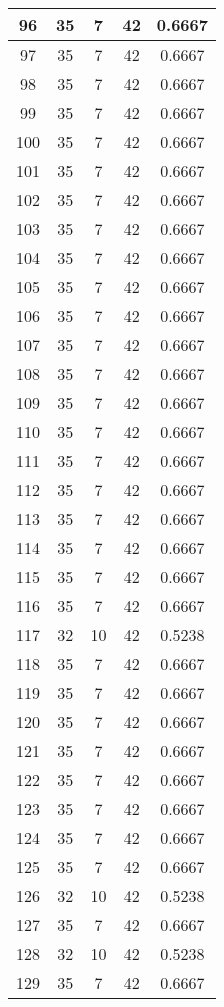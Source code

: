 \documentclass[letterpaper, 12pt]{article}
\begin{document}
\begin{longtable}{|c|c|c|c|c|}
\hline
96 & 35 & 7 & 42 & 0.6667 \\
\hline
97 & 35 & 7 & 42 & 0.6667 \\
\hline
98 & 35 & 7 & 42 & 0.6667 \\
\hline
99 & 35 & 7 & 42 & 0.6667 \\
\hline
100 & 35 & 7 & 42 & 0.6667 \\
\hline
101 & 35 & 7 & 42 & 0.6667 \\
\hline
102 & 35 & 7 & 42 & 0.6667 \\
\hline
103 & 35 & 7 & 42 & 0.6667 \\
\hline
104 & 35 & 7 & 42 & 0.6667 \\
\hline
105 & 35 & 7 & 42 & 0.6667 \\
\hline
106 & 35 & 7 & 42 & 0.6667 \\
\hline
107 & 35 & 7 & 42 & 0.6667 \\
\hline
108 & 35 & 7 & 42 & 0.6667 \\
\hline
109 & 35 & 7 & 42 & 0.6667 \\
\hline
110 & 35 & 7 & 42 & 0.6667 \\
\hline
111 & 35 & 7 & 42 & 0.6667 \\
\hline
112 & 35 & 7 & 42 & 0.6667 \\
\hline
113 & 35 & 7 & 42 & 0.6667 \\
\hline
114 & 35 & 7 & 42 & 0.6667 \\
\hline
115 & 35 & 7 & 42 & 0.6667 \\
\hline
116 & 35 & 7 & 42 & 0.6667 \\
\hline
117 & 32 & 10 & 42 & 0.5238 \\
\hline
118 & 35 & 7 & 42 & 0.6667 \\
\hline
119 & 35 & 7 & 42 & 0.6667 \\
\hline
120 & 35 & 7 & 42 & 0.6667 \\
\hline
121 & 35 & 7 & 42 & 0.6667 \\
\hline
122 & 35 & 7 & 42 & 0.6667 \\
\hline
123 & 35 & 7 & 42 & 0.6667 \\
\hline
124 & 35 & 7 & 42 & 0.6667 \\
\hline
125 & 35 & 7 & 42 & 0.6667 \\
\hline
126 & 32 & 10 & 42 & 0.5238 \\
\hline
127 & 35 & 7 & 42 & 0.6667 \\
\hline
128 & 32 & 10 & 42 & 0.5238 \\
\hline
129 & 35 & 7 & 42 & 0.6667 \\

\end{longtable}
\end{document}
